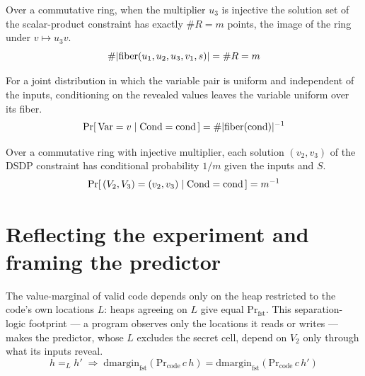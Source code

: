 \begin{lemma}
  \label{lem:exist_fiber_card}
  \rocqok
  Over a commutative ring, when the multiplier $u_3$ is injective the solution
  set of the scalar-product constraint has exactly $\#R = m$ points, the image of
  the ring under $v \mapsto u_3 v$.
  \[ \#\lvert \mathrm{fiber}(u_1,u_2,u_3,v_1,s)\rvert = \#R = m \]
\end{lemma}

\begin{lemma}
  \label{lem:exist_cpr_fiber}
  \rocqok
  For a joint distribution in which the variable pair is uniform and
  independent of the inputs, conditioning on the revealed values leaves the
  variable uniform over its fiber.
  \[ \Pr[\,\mathrm{Var}=v \mid \mathrm{Cond}=\mathrm{cond}\,]
        = \#\lvert\mathrm{fiber}(\mathrm{cond})\rvert^{-1} \]
\end{lemma}

\begin{lemma}
  \label{lem:exist_pr_sol}
  \rocqok
  Over a commutative ring with injective multiplier, each solution $(v_2,v_3)$ of
  the DSDP constraint has conditional probability $1/m$ given the inputs and $S$.
  \[ \Pr[\,(V_2,V_3)=(v_2,v_3)\mid \mathrm{Cond}=\mathrm{cond}\,] = m^{-1} \]
\end{lemma}

\section{Reflecting the experiment and framing the predictor}

\begin{lemma}
  \label{lem:Pr_fst_agree_locs}
  \rocqok
  The value-marginal of valid code depends only on the heap restricted to the
  code's own locations $L$: heaps agreeing on $L$ give equal
  $\mathrm{Pr}_{\mathrm{fst}}$. This separation-logic footprint --- a program
  observes only the locations it reads or writes --- makes the predictor, whose
  $L$ excludes the secret cell, depend on $V_2$ only through what its inputs
  reveal.
  \[ h =_{L} h' \;\Longrightarrow\;
        \mathrm{dmargin}_{\mathrm{fst}}(\mathrm{Pr}_{\mathrm{code}}\,c\,h)
        = \mathrm{dmargin}_{\mathrm{fst}}(\mathrm{Pr}_{\mathrm{code}}\,c\,h') \]
\end{lemma}

